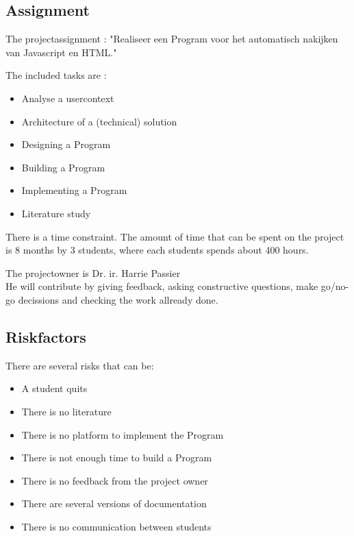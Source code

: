 \documentclass{article}
\begin{document}
\subsection{Assignment}

The projectassignment : "Realiseer een Program voor het automatisch nakijken van Javascript en HTML."

The included tasks are :
\begin{itemize}
  \item Analyse a usercontext
  \item Architecture of a (technical) solution
  \item Designing a Program
  \item Building a Program
  \item Implementing a Program
  \item Literature study
\end{itemize}

There is a time constraint. The amount of time that can be spent on the project is 8 months by 3 students, where each students spends about 400 hours.

The projectowner is Dr. ir. Harrie Passier\\
He will contribute by giving feedback, asking constructive questions, make go/no-go decissions and checking the work allready done.

\subsection{Riskfactors}

There are several risks that can be:
\begin{itemize}
  \item A student quits
  \item There is no literature
  \item There is no platform to implement the Program
  \item There is not enough time to build a Program
  \item There is no feedback from the project owner
  \item There are several versions of documentation
  \item There is no communication between students
\end{itemize}
\end{document}
